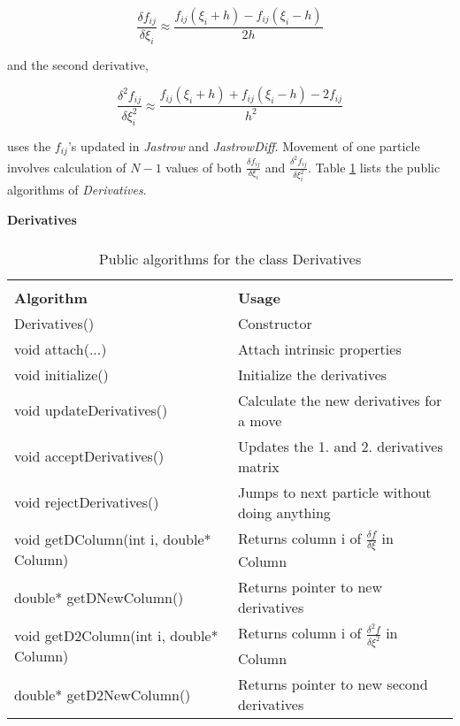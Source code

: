 \begin{equation}
  \frac{\delta f_{ij}}{\delta \xi_i} \approx \frac{f_{ij}(\xi_i+h) -
  f_{ij}(\xi_i-h)}{2h} 
\end{equation}

and the second derivative,

\begin{equation}
  \frac{\delta^2 f_{ij}}{\delta \xi_i^2} \approx \frac{f_{ij}(\xi_i+h)
  + f_{ij}(\xi_i-h) - 2 f_{ij}}{h^2}
\end{equation}

uses the $f_{ij}$'s updated in \emph{Jastrow} and
\emph{JastrowDiff}. Movement of one particle involves
calculation of $N-1$ values of both $\frac{\delta f_{ij}}{\delta \xi_i}$
and $\frac{\delta^2 f_{ij}}{\delta \xi_i^2}$. Table \ref{Derivatives}
lists the public algorithms of \emph{Derivatives}.

\begin{table}[hbtp]
\begin{center} {\large \bf Derivatives} \\ 
$\phantom{a}$ \\
\begin{tabular}{ll}
\hline\\ 
{\bf Algorithm}                   & {\bf Usage} \\
Derivatives()                     &Constructor\\
void attach(...)                  &Attach intrinsic properties\\
void initialize()                 &Initialize the derivatives\\
void updateDerivatives()          &Calculate the new derivatives for a move\\ 
void acceptDerivatives()          &Updates the 1. and 2. derivatives matrix\\
void rejectDerivatives()          &Jumps to next particle without doing
anything\\
void getDColumn(int i, double* Column) 
  &Returns column i of $\frac{\delta f}{\delta \xi}$ in Column\\
double* getDNewColumn() &Returns pointer to new derivatives\\
void getD2Column(int i, double* Column)
  &Returns column i of $\frac{\delta^2 f}{\delta \xi^2}$ in Column\\
double* getD2NewColumn()&Returns pointer to new second derivatives\\
\hline
\end{tabular} 
 \end{center}
  \caption{Public algorithms for the class Derivatives}
\label{Derivatives}
\end{table}



